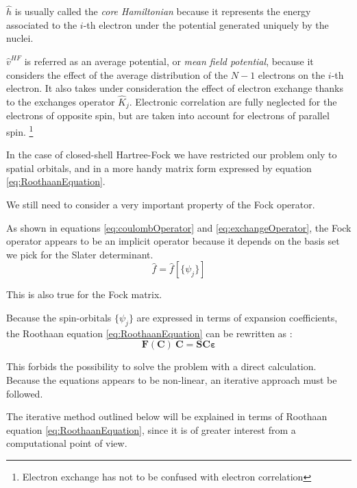 \documentclass[a4paper,12pt]{article}
\begin{document}
$\hat{h}$ is usually called the \textit{core Hamiltonian} because it represents the energy associated to the $i$-th electron under the potential generated uniquely by the nuclei.

$\hat{v}^{HF}$ is referred as an average potential, or \textit{mean field potential}, because it considers the effect of the average distribution of the $N-1$ electrons on the $i$-th electron. It also takes under consideration the effect of electron exchange thanks to the exchanges operator $\hat{K}_j$. Electronic correlation are fully neglected for the electrons of opposite spin, but are taken into account for electrons of parallel spin. \footnote{Electron exchange has not to be confused with electron correlation}

In the case of closed-shell Hartree-Fock we have restricted our problem only to spatial orbitals, and in a more handy matrix form expressed by equation \eqref{eq:RoothaanEquation}.

We still need to consider a very important property of the Fock operator.

As shown in equations \eqref{eq:coulombOperator} and \eqref{eq:exchangeOperator},
the Fock operator appears to be an implicit operator because it depends on the basis set we pick for the Slater determinant.
\begin{equation}
\hat{f} = \hat{f}[\{\psi_{j}\}]
\end{equation}

This is also true for the Fock matrix.

Because the spin-orbitals $\{\psi_{j}\}$ are expressed in terms of expansion coefficients, the Roothaan equation \eqref{eq:RoothaanEquation} can be rewritten as :
\begin{equation}
	\mathbf{F(C)~C} = \mathbf{SC\varepsilon}
\end{equation}


This forbids the possibility to solve the problem with a direct calculation. 
Because the equations appears to be non-linear, an iterative approach must be followed.

The iterative method outlined below will be explained in terms of Roothaan equation \eqref{eq:RoothaanEquation}, since it is  of greater interest from a computational point of view.
\end{document}
